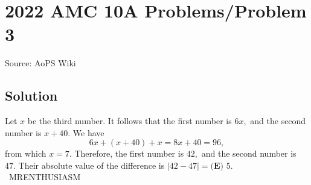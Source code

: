 \documentclass[12pt]{article}
\begin{document}
\section*{{2022 AMC 10A Problems/Problem 3}}
Source: AoPS Wiki

\subsection*{Solution}
Let $x$ be the third number. It follows that the first number is $6x,$ and the second number is $x+40.$ We have \[6x+(x+40)+x=8x+40=96,\] from which $x=7.$ Therefore, the first number is $42,$ and the second number is $47.$ Their absolute value of the difference is $|42-47|=\boxed{\textbf{(E) } 5}.$ ~MRENTHUSIASM
\end{document}
